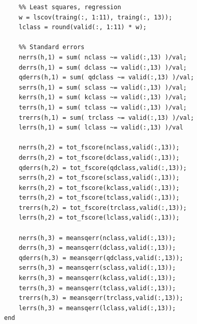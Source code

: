 \documentclass[twoside]{article}
\begin{document}
\begin{multicols}{2}
{\begin{verbatim}
    %% Least squares, regression
    w = lscov(traing(:, 1:11), traing(:, 13));
    lclass = round(valid(:, 1:11) * w);

    %% Standard errors
    nerrs(h,1) = sum( nclass ~= valid(:,13) )/val;
    derrs(h,1) = sum( dclass ~= valid(:,13) )/val;
    qderrs(h,1) = sum( qdclass ~= valid(:,13) )/val;
    serrs(h,1) = sum( sclass ~= valid(:,13) )/val;
    kerrs(h,1) = sum( kclass ~= valid(:,13) )/val;
    terrs(h,1) = sum( tclass ~= valid(:,13) )/val;
    trerrs(h,1) = sum( trclass ~= valid(:,13) )/val;
    lerrs(h,1) = sum( lclass ~= valid(:,13) )/val

    nerrs(h,2) = tot_fscore(nclass,valid(:,13));
    derrs(h,2) = tot_fscore(dclass,valid(:,13));
    qderrs(h,2) = tot_fscore(qdclass,valid(:,13));
    serrs(h,2) = tot_fscore(sclass,valid(:,13));
    kerrs(h,2) = tot_fscore(kclass,valid(:,13));
    terrs(h,2) = tot_fscore(tclass,valid(:,13));
    trerrs(h,2) = tot_fscore(trclass,valid(:,13));
    lerrs(h,2) = tot_fscore(lclass,valid(:,13));

    nerrs(h,3) = meansqerr(nclass,valid(:,13));
    derrs(h,3) = meansqerr(dclass,valid(:,13));
    qderrs(h,3) = meansqerr(qdclass,valid(:,13));
    serrs(h,3) = meansqerr(sclass,valid(:,13));
    kerrs(h,3) = meansqerr(kclass,valid(:,13));
    terrs(h,3) = meansqerr(tclass,valid(:,13));
    trerrs(h,3) = meansqerr(trclass,valid(:,13));
    lerrs(h,3) = meansqerr(lclass,valid(:,13));
end

\end{verbatim}

}

\end{multicols}
\end{document}
